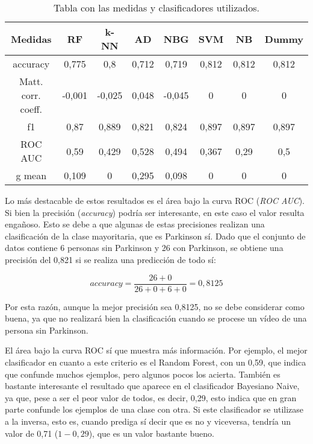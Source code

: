 \begin{table}[h]
	\begin{center}
		\begin{tabular}{| c | c | c | c | c | c | c | c |}
			\hline
			Medidas & RF & k-NN & AD & NBG & SVM & NB & Dummy \\ \hline
			accuracy & 0,775 & 0,8 & 0,712 & 0,719 & 0,812 & 0,812 & 0,812 \\
			Matt. corr. coeff. & -0,001 & -0,025 & 0,048 & -0,045 & 0 & 0 & 0 \\ 
			f1 & 0,87 & 0,889 & 0,821 & 0,824 & 0,897 & 0,897 & 0,897 \\
			ROC AUC & 0,59 & 0,429 & 0,528 & 0,494 & 0,367 & 0,29 & 0,5 \\
			g mean & 0,109 & 0 & 0,295 & 0,098 & 0 & 0 & 0 \\ \hline
		\end{tabular}
		\caption{Tabla con las medidas y clasificadores utilizados.}
		\label{tab:medidas}
	\end{center}
\end{table}

Lo más destacable de estos resultados es el área bajo la curva ROC (\textit{ROC AUC}). Si bien la precisión (\textit{accuracy}) podría ser interesante, en este caso el valor resulta engañoso. Esto se debe a que algunas de estas precisiones realizan una clasificación de la clase mayoritaria, que es Parkinson sí. Dado que el conjunto de datos contiene 6 personas sin Parkinson y 26 con Parkinson, se obtiene una precisión del 0,821 si se realiza una predicción de todo sí:

\begin{equation}
	accuracy = \frac{26 + 0}{26 + 0 + 6 + 0} = 0,8125
\end{equation}

Por esta razón, aunque la mejor precisión sea 0,8125, no se debe considerar como buena, ya que no realizará bien la clasificación cuando se procese un vídeo de una persona sin Parkinson.

El área bajo la curva ROC sí que muestra más información. Por ejemplo, el mejor clasificador en cuanto a este criterio es el Random Forest, con un 0,59, que indica que confunde muchos ejemplos, pero algunos pocos los acierta. También es bastante interesante el resultado que aparece en el clasificador Bayesiano Naive, ya que, pese a ser el peor valor de todos, es decir, 0,29, esto indica que en gran parte confunde los ejemplos de una clase con otra. Si este clasificador se utilizase a la inversa, esto es, cuando prediga sí decir que es no y viceversa, tendría un valor de 0,71 ($1 - 0,29$), que es un valor bastante bueno.

